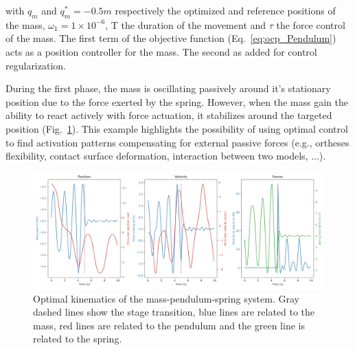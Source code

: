 \noindent with $q_m$ and $q_m^* = -0.5m$ respectively the optimized and reference positions of the mass, $\omega_1 = 1\times 10^{-6}$, T the duration of the movement and $\tau$ the force control of the mass.
The first term of the objective function (Eq.~\ref{eq:ocp_Pendulum}) acts as a position controller for the mass.
The second as added for control regularization.


During the first phase, the mass is oscillating passively around it's stationary position due to the force exerted by the spring.
However, when the mass gain the ability to react actively with force actuation, it stabilizes around the targeted position (Fig.~\ref{fig:Mass_Pendulum_Fext_graphs}).
This example highlights the possibility of using optimal control to find activation patterns compensating for external passive forces (e.g., ortheses flexibility, contact surface deformation, interaction between two models, ...).

\begin{figure}[t!]
\centering
\includegraphics[width=\textwidth]{figures/Mass_Pendulum_Fext.png}
\caption{Optimal kinematics of the mass-pendulum-spring system. Gray dashed lines show the stage transition, blue lines are related to the mass, red lines are related to the pendulum and the green line is related to the spring.}
\label{fig:Mass_Pendulum_Fext_graphs}
\end{figure}














